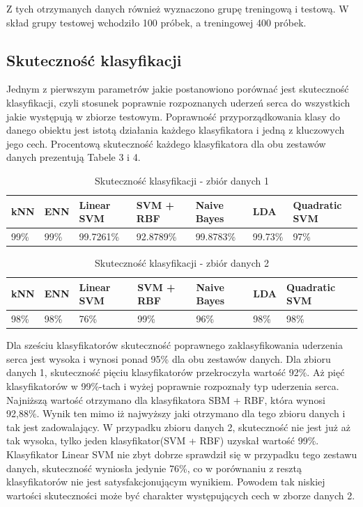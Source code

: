 \documentclass[[10pt,a4paper]{article}
\begin{document}
Z tych otrzymanych danych również wyznaczono grupę treningową i testową. W skład grupy testowej wchodziło  100 próbek, a treningowej 400 próbek.

\subsection{Skuteczność klasyfikacji}

Jednym z pierwszym parametrów jakie postanowiono porównać jest skuteczność klasyfikacji, czyli stosunek poprawnie rozpoznanych uderzeń serca do wszystkich jakie występują w zbiorze testowym. Poprawność przyporządkowania klasy do danego obiektu jest istotą działania każdego klasyfikatora i jedną z kluczowych jego cech. Procentową skuteczność każdego klasyfikatora  dla obu zestawów danych prezentują Tabele 3 i 4.

\begin{table}[h]
\centering
\caption{Skuteczność klasyfikacji - zbiór danych 1}
\label{accuracyTable2}
\begin{tabular}{|l|l|l|l|l|l|l|}
\hline
kNN & ENN & Linear SVM & SVM + RBF & Naive Bayes & LDA & Quadratic SVM \\ \hline
  99\%   &  99\%  & 99.7261\%       & 92.8789\%      & 99.8783\%        &   99.73\%  & 97\%\\ \hline
\end{tabular}
\end{table}

\begin{table}[h]
\centering
\caption{Skuteczność klasyfikacji - zbiór danych 2}
\label{accuracyTable1}
\begin{tabular}{|l|l|l|l|l|l|l|}
\hline
kNN & ENN & Linear SVM & SVM + RBF & Naive Bayes & LDA & Quadratic SVM\\ \hline
  98\%   &  98\%  & 76\%       & 99\%      & 96\%         & 98\%	& 98\%  \\ \hline
\end{tabular}
\end{table}

Dla sześciu klasyfikatorów skuteczność poprawnego zaklasyfikowania uderzenia serca jest wysoka i wynosi ponad 95\% dla obu zestawów danych. Dla zbioru danych 1,  skuteczność pięciu klasyfikatorów przekroczyła wartość 92\%.  Aż pięć klasyfikatorów w 99\%-tach i wyżej poprawnie rozpoznały typ uderzenia serca. Najniższą wartość otrzymano dla klasyfikatora SBM + RBF, która wynosi 92,88\%. Wynik ten mimo iż najwyższy jaki otrzymano dla tego zbioru danych i tak jest zadowalający. W przypadku zbioru danych 2, skuteczność nie jest już aż tak wysoka, tylko jeden klasyfikator(SVM + RBF) uzyskał wartość 99\%. Klasyfikator Linear SVM nie zbyt dobrze sprawdził się w przypadku tego zestawu danych, skuteczność wyniosła jedynie 76\%, co w porównaniu z resztą klasyfikatorów nie jest satysfakcjonującym wynikiem. Powodem tak niskiej wartości skuteczności może być charakter występujących cech w zborze danych 2. 
\end{document}
